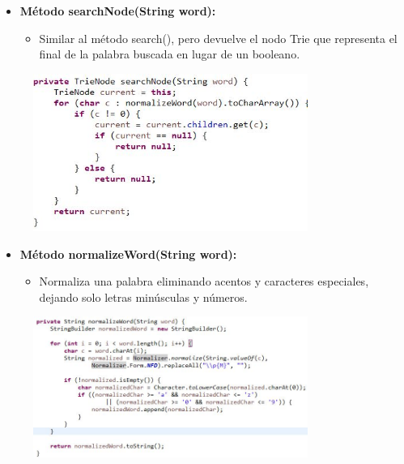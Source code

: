 \documentclass{article}
\begin{document}
	\begin{itemize}
	\item \textbf{Método searchNode(String word):}
	 \begin{itemize}
	 \item Similar al método search(), pero devuelve el nodo Trie que representa el final de la palabra buscada en lugar de un booleano.
	 \end{itemize}
	\end{itemize}
	 \begin{figure}[H]
		\centering
		\includegraphics[width=0.8\textwidth,keepaspectratio]{img/TN4.jpg}
	\end{figure}	
	
	\begin{itemize}
	\item \textbf{Método normalizeWord(String word):}
	 \begin{itemize}
	 \item Normaliza una palabra eliminando acentos y caracteres especiales, dejando solo letras minúsculas y números.
	 \end{itemize}
	\end{itemize}
	 \begin{figure}[H]
		\centering
		\includegraphics[width=0.8\textwidth,keepaspectratio]{img/TN5.jpg}
	\end{figure}
	\clearpage
	
\end{document}
